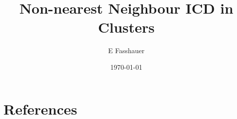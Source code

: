 \documentclass[12pt,twocolumn]{iopart}
\begin{document}
\setlength{\tabcolsep}{12pt}


\title[Non-nearest Neighbour ICD in Clusters]{Non-nearest Neighbour ICD in
       Clusters}

\author{E Fasshauer}
\address{Centre for Theoretical and Computational Chemistry,
         Department of Chemistry, University of Troms\o,
         -- The Arctic University of Norway, N-9037 Troms\o, Norway}



\date{\today}

\begin{abstract}
 
\end{abstract}


\maketitle












\eject
\section*{References}




\end{document}
